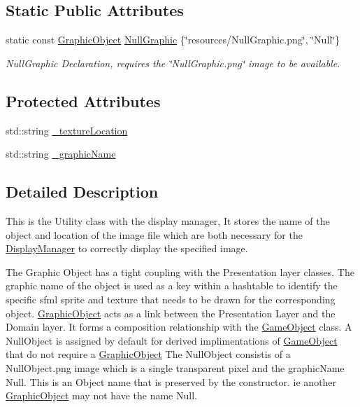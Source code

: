 \subsection*{Static Public Attributes}
\begin{DoxyCompactItemize}
\item 
static const \hyperlink{class_graphic_object}{Graphic\+Object} \hyperlink{class_graphic_object_a3a6832e8f4af96da2935d3c69757107c}{Null\+Graphic} \{\char`\"{}resources/Null\+Graphic.\+png\char`\"{}, \char`\"{}Null\char`\"{}\}
\begin{DoxyCompactList}\small\item\em Null\+Graphic Declaration, requires the \char`\"{}\+Null\+Graphic.\+png\char`\"{} image to be available. \end{DoxyCompactList}\end{DoxyCompactItemize}
\subsection*{Protected Attributes}
\begin{DoxyCompactItemize}
\item 
std\+::string \hyperlink{class_graphic_object_a3fc571887a6e46dda4a4ef10d44720b5}{\+\_\+texture\+Location}
\item 
std\+::string \hyperlink{class_graphic_object_a74c9292d37d9be9e099c868be084b33f}{\+\_\+graphic\+Name}
\end{DoxyCompactItemize}


\subsection{Detailed Description}
This is the Utility class with the display manager, It stores the name of the object and location of the image file which are both necessary for the \hyperlink{class_display_manager}{Display\+Manager} to correctly display the specified image. 

The Graphic Object has a tight coupling with the Presentation layer classes. The graphic name of the object is used as a key within a hashtable to identify the specific sfml sprite and texture that needs to be drawn for the corresponding object. \hyperlink{class_graphic_object}{Graphic\+Object} acts as a link between the Presentation Layer and the Domain layer. It forms a composition relationship with the \hyperlink{class_game_object}{Game\+Object} class. A Null\+Object is assigned by default for derived implimentations of \hyperlink{class_game_object}{Game\+Object} that do not require a \hyperlink{class_graphic_object}{Graphic\+Object} The Null\+Object consistis of a Null\+Object.\+png image which is a single transparent pixel and the graphic\+Name Null. This is an Object name that is preserved by the constructor. ie another \hyperlink{class_graphic_object}{Graphic\+Object} may not have the name Null. 

